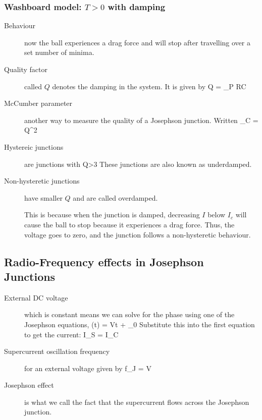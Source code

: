 \subsubsection{Washboard model: $T>0$ with damping}
\begin{description}
\item[Behaviour] now the ball experiences a drag force and will stop after travelling over a set number of minima. 

\item[Quality factor] called $Q$ denotes the damping in the system. It is given by 
\beq
Q = \omega_P RC
\eeq

\item[McCumber parameter] another way to measure the quality of a Josephson junction. Written
\beq
\beta_C = Q^2
\eeq


\item[Hystereic junctions] are junctions with 
\beq
Q>3
\eeq
These junctions are also known as underdamped. 

\item[Non-hysteretic junctions] have smaller $Q$ and are called overdamped. 

This is because when the junction is damped, decreasing $I$ below $I_c$ will cause the ball to stop because it experiences a drag force. Thus, the voltage goes to zero, and the junction follows a non-hysteretic behaviour. 




\end{description}

\subsection{Radio-Frequency effects in Josephson Junctions}
\begin{description}
\item[External DC voltage] which is constant means we can solve for the phase using one of the Josephson equations, 
\beq
\phi(t) =  Vt + \phi_0
\eeq
Substitute this into the first equation to get the current:
\beq
I_S = I_C 
\eeq

\item[Supercurrent oscillation frequency] for an external voltage given by
\beq
f_J =   V
\eeq

\item[Josephson effect] is what we call the fact that the supercurrent flows across the Josephson junction. 



\end{description}
